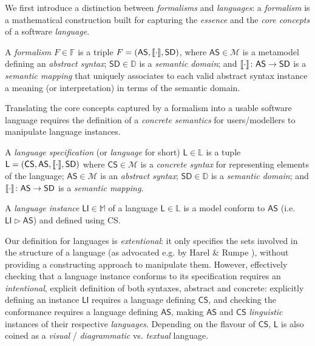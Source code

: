 We first introduce a distinction between \emph{formalisms} and \emph{languages}: 
a \emph{formalism} is a mathematical construction built for capturing the 
\emph{essence} and the \emph{core concepts} of a software \emph{language}. 

\begin{Definition}[Formalism]
   A \emph{formalism} $F\in\mathbb{F}$ is a triple $F = (\mathsf{AS}, 
\llbracket \cdot \rrbracket, \mathsf{SD})$, where $\mathsf{AS}\in\mathcal{M}$ is a metamodel 
defining an \emph{abstract syntax}; $\mathsf{SD}\in\mathbb{D}$ is a 
\emph{semantic domain}; and $\llbracket \cdot \rrbracket 
\colon \mathsf{AS} \to \mathsf{SD}$ is a \emph{semantic mapping} that uniquely 
associates to each valid abstract syntax instance a meaning (or interpretation) 
in terms of the semantic domain.
\end{Definition}

Translating the core concepts captured by a formalism into a usable software 
language requires the definition of a \emph{concrete semantics} for 
users/modellers to manipulate language instances.


 \begin{Definition}[Language]
   A \emph{language specification} (or \emph{language} 
for short) $\mathsf{L}\in\mathbb{L}$ is a tuple $\mathsf{L} = (\mathsf{CS}, 
\mathsf{AS}, \llbracket \cdot \rrbracket, \mathsf{SD})$ where $\mathsf{CS}\in\mathcal{M}$ is a 
\emph{concrete syntax} for representing elements of the language;  
$\mathsf{AS}\in\mathcal{M}$ is an \emph{abstract syntax}; 
$\mathsf{SD}\in\mathbb{D}$ is 
a \emph{semantic domain}; and $\llbracket \cdot \rrbracket \colon \mathsf{AS} \to \mathsf{SD}$ is 
a \emph{semantic mapping}. 

   A \emph{language instance} $\mathsf{LI}\in\mathbb{M}$ of a language 
$\mathsf{L}\in\mathbb{L}$ is a model conform to $\mathsf{AS}$ (i.e. 
$\mathsf{LI} \rhd \mathsf{AS}$) and defined using \textsf{CS}.
\end{Definition}

\smallskip\noindent
Our definition for languages is \emph{extentional}: it only specifies the sets 
involved in the structure of a language (as advocated e.g. by Harel \& Rumpe 
\cite{J:Harel-Rumpe:2004}), without providing a constructing approach to 
manipulate them. However, effectively checking that a language instance 
conforms to its specification requires an \emph{intentional}, explicit 
definition of both syntaxes, abstract and concrete: explicitly defining an 
instance $\mathsf{LI}$ requires a language defining $\mathsf{CS}$, and checking 
the conformance requires a language defining $\mathsf{AS}$, making 
$\mathsf{AS}$ and $\mathsf{CS}$ \emph{linguistic} instances of their respective 
\emph{languages}. Depending on the flavour of $\mathsf{CS}$, $\mathsf{L}$ is 
also coined as a \emph{visual} / \emph{diagrammatic} vs. \emph{textual} 
language.

